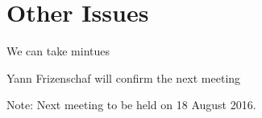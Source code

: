 \documentclass[11pt, a4paper]{article}
\begin{document}
 


\section{Other Issues}



We can take mintues 

Yann Frizenschaf will confirm the next meeting




\vspace*{10pt}

\noindent Note: Next meeting to be held on 18 August 2016.
\end{document}
